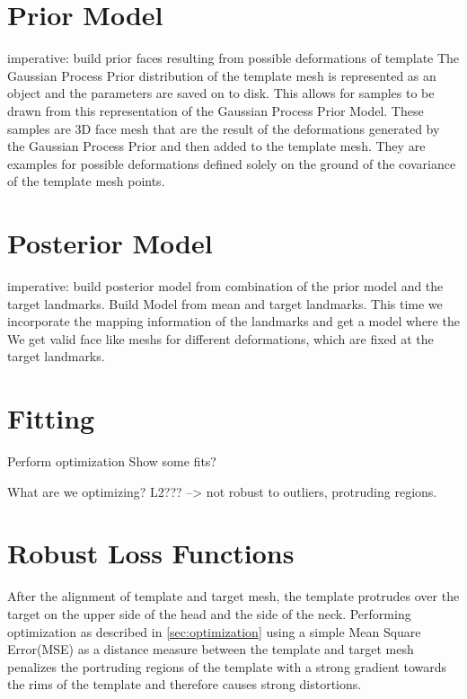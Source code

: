 \section{Prior Model}
imperative: build prior faces resulting from possible deformations of template
The Gaussian Process Prior distribution of the template mesh is represented as an object and the parameters are saved on to disk. This allows for samples to be drawn from this representation of the Gaussian Process Prior Model. These samples are 3D face mesh that are the result of the deformations generated by the Gaussian Process Prior and then added to the template mesh. They are examples for possible deformations defined solely on the ground of the covariance of the template mesh points.

\section{Posterior Model}
imperative: build posterior model from combination of the prior model and the target landmarks. 
Build Model from mean and target landmarks. This time we incorporate the mapping information of the landmarks and get a model where the
We get valid face like meshs for different deformations, which are fixed at the target landmarks.

\section{Fitting}
Perform optimization
Show some fits?

What are we optimizing? L2??? --> not robust to outliers, protruding regions.
\section{Robust Loss Functions}
After the alignment of template and target mesh, the template protrudes over the target on the upper side of the head and the side of the neck.
Performing optimization as described in \ref{sec:optimization} using a simple Mean Square Error(MSE) as a distance measure between the template and target mesh penalizes the portruding regions of the template with a strong gradient towards the rims of the template and therefore causes strong distortions. 

